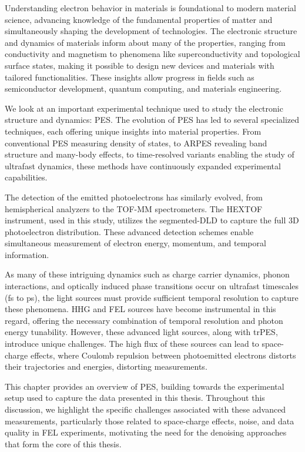 
Understanding electron behavior in materials is foundational to modern material science, advancing knowledge of the fundamental properties of matter and simultaneously shaping the development of technologies. The electronic structure and dynamics of materials inform about many of the properties, ranging from conductivity and magnetism to phenomena like superconductivity and topological surface states, making it possible to design new devices and materials with tailored functionalities. These insights allow progress in fields such as semiconductor development, quantum computing, and materials engineering.

We look at an important experimental technique used to study the electronic structure and dynamics: \gls{PES}. The evolution of \gls{PES} has led to several specialized techniques, each offering unique insights into material properties. From conventional \gls{PES} measuring density of states, to \gls{ARPES} revealing band structure and many-body effects, to time-resolved variants enabling the study of ultrafast dynamics, these methods have continuously expanded experimental capabilities. 

The detection of the emitted photoelectrons has similarly evolved, from hemispherical analyzers to the \gls{TOF}-\gls{MM} spectrometers. The \gls{HEXTOF} instrument, used in this study, utilizes the segmented-\gls{DLD} to capture the full 3D photoelectron distribution. These advanced detection schemes enable simultaneous measurement of electron energy, momentum, and temporal information.

As many of these intriguing dynamics such as charge carrier dynamics, phonon interactions, and optically induced phase transitions occur on ultrafast timescales (\unit{fs} to \unit{ps}), the light sources must provide sufficient temporal resolution to capture these phenomena. \Gls{HHG} and \gls{FEL} sources have become instrumental in this regard, offering the necessary combination of temporal resolution and photon energy tunability. However, these advanced light sources, along with \gls{trPES}, introduce unique challenges. The high flux of these sources can lead to space-charge effects, where Coulomb repulsion between photoemitted electrons distorts their trajectories and energies, distorting measurements.

This chapter provides an overview of \gls{PES}, building towards the experimental setup used to capture the data presented in this thesis. Throughout this discussion, we highlight the specific challenges associated with these advanced measurements, particularly those related to space-charge effects, noise, and data quality in \gls{FEL} experiments, motivating the need for the denoising approaches that form the core of this thesis.

